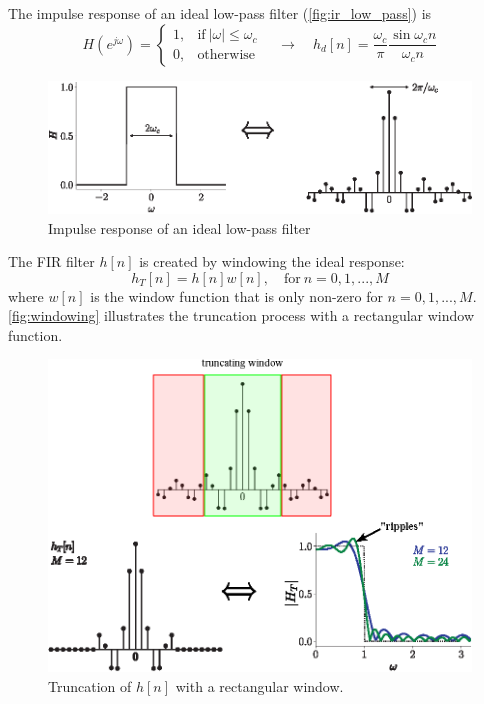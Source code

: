 \begin{ex}{}
The impulse response of an ideal low-pass filter (\autoref{fig:ir_low_pass}) is 
\[
    H(e^{j\omega}) = 
    \begin{cases} 
    1, & \text{if} \ \lvert \omega \rvert \leq \omega_{c} \\ 
    0, & \text{otherwise}
    \end{cases}
    \quad \to \quad
    h_{d}[n] = \frac{\omega_{c}}{\pi}\frac{\sin\omega_{c}n}{\omega_{c}n}
\]
\begin{figure}[H]
    \centering
    \includegraphics{images/low-pass-response.eps}
    \caption{Impulse response of an ideal low-pass filter}
    \label{fig:ir_low_pass}
\end{figure}

The FIR filter $h[n]$ is created by windowing the ideal response:
\[
    h_{T}[n] = h[n] w[n], \quad \text{for} \ n=0, 1, ..., M
\]
where $w[n]$ is the window function that is only non-zero for $n=0, 1, ..., M$. \autoref{fig:windowing} illustrates the truncation process with a rectangular window function.

\begin{figure}[H]
    \centering
    \includegraphics{images/windowing.eps}
    \caption{Truncation of $h[n]$ with a rectangular window.}
    \label{fig:windowing}
\end{figure}


\end{ex}
